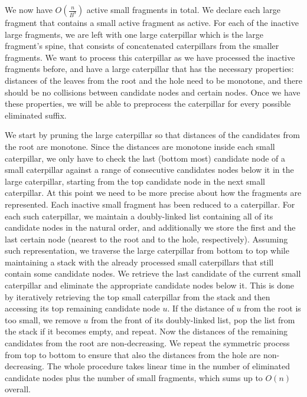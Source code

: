 \documentclass[11pt,a4paper]{article}
\theoremstyle{definition}
\theoremstyle{remark}
\begin{document}
We now have $O(\frac{n}{B^9})$ active small fragments in total. We declare each large fragment that contains
a small active fragment as active. For each of the inactive large fragments, we are left with one large caterpillar
which is the large fragment's spine, that consists of concatenated caterpillars from the smaller fragments. We want
to process this caterpillar as we have processed the inactive fragments before, and have a large caterpillar that has
the necessary properties: distances of the leaves from the root and the hole need to be monotone, and there
should be no collisions between candidate nodes and certain nodes. Once we have these properties, we will
be able to preprocess the caterpillar for every possible eliminated suffix.

We start by pruning the large caterpillar so that distances of the candidates from the root are
monotone. Since the distances are monotone inside each small caterpillar, we only have to check the last (bottom most) 
candidate node of a small caterpillar against a range of consecutive candidates nodes below it in the large
caterpillar, starting from the top candidate node in the next small caterpillar. 
At this point we need to be more precise about how the fragments are represented. Each inactive small
fragment has been reduced to a caterpillar. For each such caterpillar, we maintain a doubly-linked list containing
all of its candidate nodes in the natural order, and additionally we store the first and the last certain
node (nearest to the root and to the hole, respectively). Assuming such representation, we traverse
the large caterpillar from bottom to top while
maintaining a stack with the already processed small caterpillars that still contain some candidate nodes.
We retrieve the last candidate of the current small caterpillar and eliminate the appropriate candidate
nodes below it. This is done by iteratively retrieving the top small caterpillar from the stack and then
accessing its top remaining candidate node $u$. If the distance of $u$ from the root is too small, we
remove $u$ from the front of its doubly-linked list, pop the list from the stack if it becomes empty,
and repeat. Now the distances of the remaining candidates from the root are
non-decreasing. We repeat the symmetric process from top to bottom to ensure that also the distances
from the hole are non-decreasing. The whole procedure takes linear time in the number of eliminated
candidate nodes plus the number of small fragments, which sums up to $O(n)$ overall.
\end{document}
